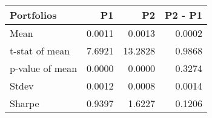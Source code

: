 \begin{tabular}{lrrr}
\toprule
Portfolios & P1 & P2 & P2 - P1 \\
\midrule
Mean & 0.0011 & 0.0013 & 0.0002 \\
t-stat of mean & 7.6921 & 13.2828 & 0.9868 \\
p-value of mean & 0.0000 & 0.0000 & 0.3274 \\
Stdev & 0.0012 & 0.0008 & 0.0014 \\
Sharpe & 0.9397 & 1.6227 & 0.1206 \\
\bottomrule
\end{tabular}
